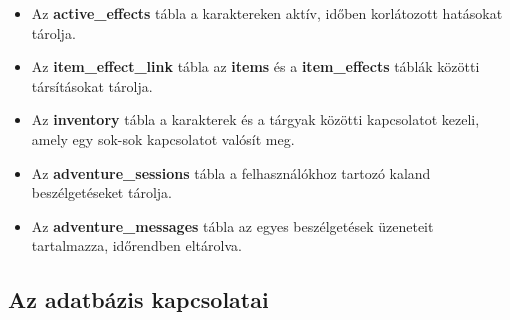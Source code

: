 \documentclass[
]{thesis-ekf}
\theoremstyle{definition}
\theoremstyle{remark}
\begin{document}
\begin{itemize}
    \item 
    Az \textbf{active\_effects} tábla a karaktereken aktív, időben korlátozott hatásokat tárolja.

    \item 
    Az \textbf{item\_effect\_link} tábla az \textbf{items} és a \textbf{item\_effects} táblák közötti társításokat tárolja. 

    \item 
    Az \textbf{inventory} tábla a karakterek és a tárgyak közötti kapcsolatot kezeli, amely egy sok-sok kapcsolatot valósít meg.

    \item
    Az \textbf{adventure\_sessions} tábla a felhasználókhoz tartozó kaland beszélgetéseket tárolja.

    \item 
    Az \textbf{adventure\_messages} tábla az egyes beszélgetések üzeneteit tartalmazza, időrendben eltárolva.

\end{itemize}

\subsection{Az adatbázis kapcsolatai}
\end{document}
